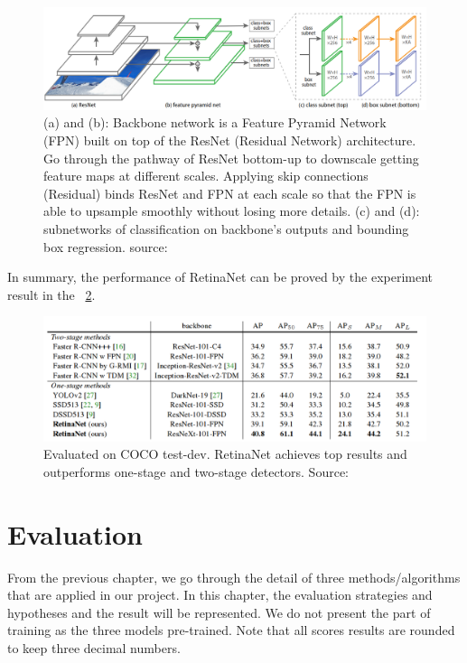 \documentclass[runningheads]{llncs}
\begin{document}
\begin{figure}[H]
\includegraphics[width=\textwidth]{figs/RetinaNet_network.png}
\caption{(a) and (b): Backbone network is a Feature Pyramid Network (FPN) built on top of the ResNet (Residual Network) architecture. Go through the pathway of ResNet bottom-up to downscale getting feature maps at different scales. Applying skip connections (Residual) binds ResNet and FPN at each scale so that the FPN is able to upsample smoothly without losing more details. (c) and (d): subnetworks of classification on backbone’s outputs and bounding box regression. source: ~\cite{ref_retinanet}} \label{fig8}
\end{figure}

In summary, the performance of RetinaNet can be proved by the experiment result in the ~\ref{fig9}.
\begin{figure}[htbp]
\includegraphics[width=\textwidth]{figs/RetinaNet_object_detection.png}
\caption{Evaluated on COCO test-dev. RetinaNet achieves top results and outperforms one-stage and two-stage detectors. Source: ~\cite{ref_retinanet}} \label{fig9}
\end{figure}


\section{Evaluation}
From the previous chapter, we go through the detail of three methods/algorithms that are applied in our project. In this chapter, the evaluation strategies and hypotheses and the result will be represented. We do not present the part of training as the three models pre-trained. Note that all scores results are rounded to keep three decimal numbers.
\end{document}
